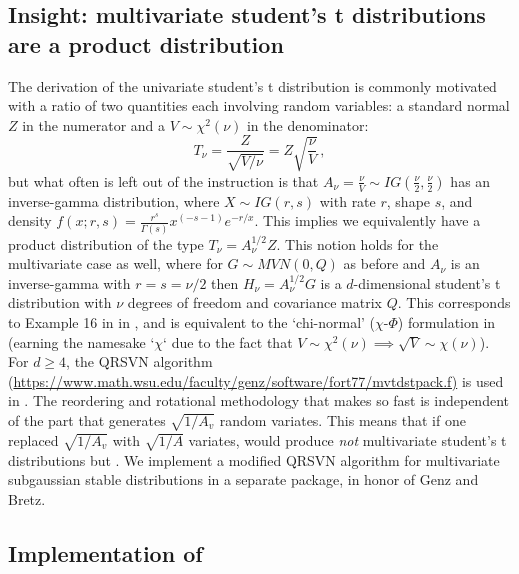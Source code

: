 \subsection{Insight: multivariate student's t
  distributions are a product distribution \label{sect:A:invgamma}}

The derivation of the univariate student's t distribution is commonly motivated
with a ratio of two quantities each involving random variables: a
standard normal $Z$ in the numerator and a $V \sim \chi^2(\nu)$ in the
denominator:
$$ T_\nu = \frac{Z}{\sqrt{V/\nu}} = Z\sqrt{ \frac{\nu}{V}} \,,$$
but what often is left out of the instruction is that
$A_\nu = \frac{\nu}{V} \sim IG\left( \frac{\nu}{2},
  \frac{\nu}{2}\right)$ has an inverse-gamma distribution, where
$X \sim IG\left(r, s \right)$ with rate $r$, shape $s$, and density
$f(x; r, s) = \frac{r^s}{\Gamma(s)}x^{(-s-1)} e^{-r/x}$.  This implies
we equivalently have a product distribution of the type
$T_\nu = A^{1/2}_\nu Z$.  This notion holds for the multivariate case
as well, where for $G \sim MVN( 0, Q)$ as before and $A_\nu$ is an
inverse-gamma with $r=s=\nu/2$
then $H_\nu=A_\nu^{1/2} G$ is a $d$-dimensional student's t
distribution with $\nu$ degrees of freedom and covariance matrix $Q$.
This corresponds to Example 16 in in \citet{hamdan2000characterizing},
and is equivalent to the `chi-normal' ($\chi$-$\Phi$) formulation in
\citet{genz2002comparison} (earning the namesake `$\chi$` due to the
fact that $V \sim \chi^2(\nu) \implies \sqrt{V} \sim \chi(\nu)$).  For
$d \ge 4$, the QRSVN algorithm (\url{https://www.math.wsu.edu/faculty/genz/software/fort77/mvtdstpack.f)} is used in .  The
reordering and rotational methodology that makes 
so fast is independent of the part that generates $\sqrt{1/A_v}$
random variates. This means that if one replaced $\sqrt{1/A_v}$ with
$\sqrt{1/A}$ variates,  would produce \emph{not}
multivariate student's t distributions but .  We implement a modified QRSVN
algorithm for multivariate subgaussian stable distributions in a
separate package,  in honor of Genz and Bretz.


\subsection{Implementation of  \label{sect:imp2}}



